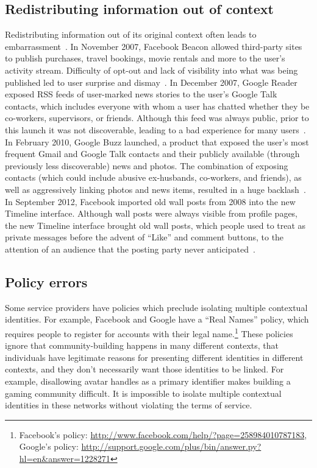 \documentclass[10pt, conference, compsocconf]{IEEEtran}
\begin{document}
\subsection{Redistributing information out of context}
Redistributing information out of its original context often leads to
embarrassment~\cite{nissenbaum}.  In November 2007, Facebook Beacon allowed
third-party sites to publish purchases, travel bookings, movie rentals and more
to the user's activity stream.  Difficulty of opt-out and lack of visibility
into what was being published led to user surprise and dismay~\cite{mccarthy,nakashima}.  In December 2007, Google Reader exposed
RSS feeds of user-marked news stories to the user's Google Talk contacts, which
includes everyone with whom a user has chatted whether they be co-workers,
supervisors, or friends. Although this feed was always public, prior to this
launch it was not discoverable, leading to a bad experience for many
users~\cite{helft}. In February 2010, Google Buzz launched, a product that
exposed the user's most frequent Gmail and Google Talk contacts and their
publicly available (through previously less discoverable) news and photos.  The
combination of exposing contacts (which could include abusive ex-husbands,
co-workers, and friends), as well as aggressively linking photos and news
items, resulted in a huge backlash~\cite{fugitivus,buzz}. In September 2012,
Facebook imported old wall posts from 2008 into the new Timeline interface.
Although wall posts were always visible from profile pages, the new Timeline
interface brought old wall posts, which people used to treat as private messages
before the advent of ``Like'' and comment buttons, to the attention of an
audience that the posting party never anticipated~\cite{timeline}.

\subsection{Policy errors}
\label{sec:policies}
Some service providers have policies which preclude isolating multiple
contextual identities. For example, Facebook and Google have a ``Real Names''
policy, which requires people to register for accounts with their legal
name.\footnote{Facebook's policy: \url{http://www.facebook.com/help/?page=258984010787183}, Google's policy: \url{http://support.google.com/plus/bin/answer.py?hl=en&answer=1228271}}
These policies ignore that
community-building happens in many different contexts, that individuals have
legitimate reasons for presenting different identities in different contexts,
and they don't necessarily want those identities to be linked. For
example, disallowing avatar handles as a primary identifier makes building a
gaming community difficult. %
It is impossible to isolate multiple contextual identities in these networks
without violating the terms of service.
\end{document}
